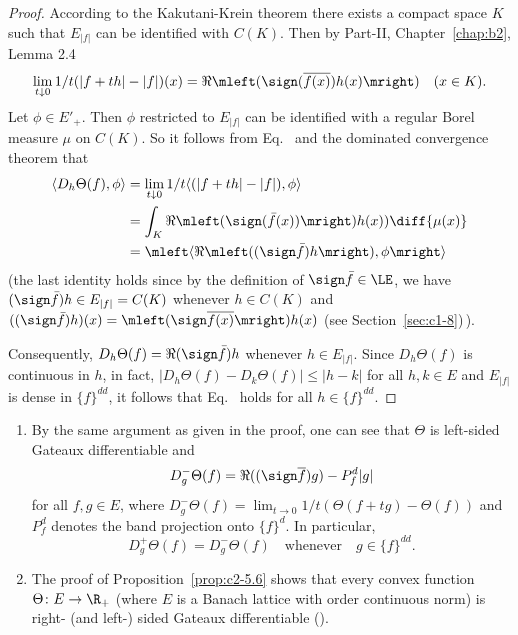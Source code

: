 \begin{proof}
According to the Kakutani-Krein theorem there exists a compact space
$K$ such that $E_{|f|}$ can be identified with $C(K)$. Then by Part-II, Chapter~\ref{chap:b2}, 
Lemma 2.4
\begin{equation}\label{eq:c2-5.9}
\lim_{t \downarrow 0} 1/t(|f+th| - |f|)(x) = \Re\mleft(\sign (\overline{f(x)})h(x)\mright) \quad (x \in K).
\end{equation}
Let $\phi \in E'_{+}$. Then $\phi$ restricted to $E_{|f|}$ can be identified with a regular Borel measure $\mu$ on $C(K)$.
So it follows from Eq.~ and the dominated convergence theorem that
\begin{align*}
\langle D_{h}\Theta(f),\phi \rangle &= \lim_{t \downarrow 0} 1/t \langle(|f + th| - |f|),\phi \rangle\\
&= \int_{K} \Re\mleft(\sign (\bar{f}(x))\mright)h(x)) \diff{\mu(x)} \\
&= \mleft\langle\Re\mleft((\sign  \bar{f})h\mright),\phi\mright\rangle
\end{align*}
(the last identity holds since by the definition of\/ $\sign  \bar{f} \in \LE$,
we have $(\sign  \bar{f})h \in E_{|f|} = C(K)$ whenever $h \in C(K)$ and
$((\sign  \bar{f})h)(x) = \mleft(\sign  \overline{f(x)}\mright)h(x)$  
(see Section~\ref{sec:c1-8})\,).

Consequently, $D_{h}\Theta(f) = \Re(\sign  \bar{f})h$ whenever $h \in E_{|f|}$. 
Since $D_{h}\Theta(f)$ is continuous in $h$, in fact, $|D_{h}\Theta(f) - D_{k}\Theta(f)| \leq |h - k|$ for all $h,k \in E$ and $E_{|f|}$ is dense in $\{f\}^{dd}$, it follows that Eq.~ holds for all $h \in \{f\}^{dd}$.
\end{proof}
\begin{remark}\label{rem:c2-5.7} 
\begin{enumerate}[\upshape (i), wide, labelindent=.25em] %
\item \label{rem:c2-5.7-1}
By the same argument as given in the proof, one can see
that $\Theta$ is left-sided Gateaux differentiable and
\begin{equation*}
D^{-}_{g}\Theta(f) = \Re((\sign  \overline{f})g) - P^{d}_{f}|g|
\end{equation*}
for all $f, g \in E$, where $D^{-}_{g}\Theta(f) = \lim_{t \to 0} 1/t(\Theta(f + tg) - \Theta(f))$ and
$P^{d}_{f}$ denotes the band projection onto $\{f\}^{d}$. 
In particular,
\begin{equation}\label{eq:c2-5.10}
D^{+}_{g}\Theta(f) = D^{-}_{g}\Theta(f) \quad \text{whenever} \quad g \in \{f\}^{dd}.
\end{equation}
\item \label{rem:c2-5.7-2}
The proof of  Proposition~\ref{prop:c2-5.6}   shows that every convex function $\Theta \colon E \to \R_{+}$
(where $E$ is a Banach lattice with order continuous norm) is right- (and left-) sided Gateaux differentiable (\cf \textcite{ arendt:1982}).
\end{enumerate}
\end{remark}
